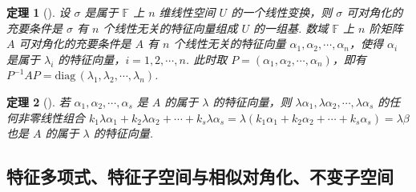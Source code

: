 \documentclass[zihao=-4,UTF8,linespread=1.8,nothm]{aytony_base}
\newtheorem{theorem}{\indent 定理}[subsection]
\begin{document}
\begin{theorem}[]
    设 $\sigma$ 是属于 $\mathbb{F}$ 上 $n$ 维线性空间 $U$ 的一个线性变换，则 $\sigma$ 可对角化的充要条件是 $\sigma$ 有 $n$ 个线性无关的特征向量组成 $U$ 的一组基. 数域 $\mathbb{F}$ 上 $n$ 阶矩阵 $A$ 可对角化的充要条件是 $A$ 有 $n$ 个线性无关的特征向量 ${\alpha}_1, {\alpha}_2, \cdots, {\alpha}_{n}$，使得 $\alpha_i$ 是属于 $\lambda_i$ 的特征向量，$i = 1, 2, \cdots, n$. 此时取 $P = ({\alpha}_1, {\alpha}_2, \cdots, {\alpha}_{n})$，即有 $P^{-1}AP = \mathrm{diag}\,({\lambda}_1, {\lambda}_2, \cdots, {\lambda}_{n})$.
\end{theorem}

\begin{theorem}[]
    若 ${\alpha}_1, {\alpha}_2, \cdots, {\alpha}_{s}$ 是 $A$ 的属于 $\lambda$ 的特征向量，则 $\lambda{\alpha}_1, \lambda{\alpha}_2, \cdots, \lambda{\alpha}_{s}$ 的任何非零线性组合 $k_1\lambda\alpha_1 + k_2\lambda\alpha_2 + \cdots + k_s\lambda\alpha_s = \lambda(k_1\alpha_1 + k_2\alpha_2 + \cdots + k_s\alpha_s) = \lambda\beta$ 也是 $A$ 的属于 $\lambda$ 的特征向量.
\end{theorem}

\subsection{特征多项式、特征子空间与相似对角化、不变子空间}
\end{document}
